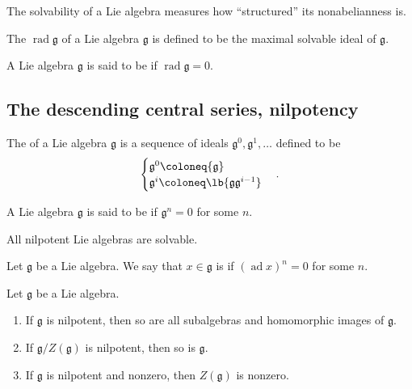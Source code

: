 \documentclass{article}
\DeclarePairedDelimiter\lb\lbrack\rbrack
\DeclareMathOperator{\rad}{rad}
\DeclareMathOperator{\ad}{ad}
\newcommand*\frkg{{\ensuremath{\mathfrak{g}}}}
\begin{document}
The solvability of a Lie algebra measures how ``structured'' its nonabelianness is.

\begin{definition}
    The  $\rad \frkg$ of a Lie algebra $\frkg$ is defined to be the maximal solvable ideal of $\frkg$.
\end{definition}

\begin{definition}
    A Lie algebra $\frkg$ is said to be  if $\rad \frkg = 0$.
\end{definition}

\subsection{The descending central series, nilpotency}

\begin{definition}
    The  of a Lie algebra $\frkg$ is a sequence of ideals $\frkg^0, \frkg^1, \ldots$ defined to be
    \[
        \begin{cases}
            \frkg^0 \coloneq \frkg \\
            \frkg^i \coloneq \lb{\frkg\frkg^{i-1}} \\
        \end{cases}.
    \]
\end{definition}

\begin{definition}
    A Lie algebra $\frkg$ is said to be  if $\frkg^n = 0$ for some $n$.
\end{definition}

\begin{proposition}
    All nilpotent Lie algebras are solvable.
\end{proposition}

\begin{definition}
    Let $\frkg$ be a Lie algebra.
    We say that $x \in \frkg$ is  if $(\ad x)^n = 0$ for some $n$.
\end{definition}

\begin{theorem}
    Let $\frkg$ be a Lie algebra.
    \begin{enumerate}[label=(\alph*)]
        \item 
            If $\frkg$ is nilpotent, then so are all subalgebras and homomorphic images of $\frkg$.
        \item 
            If $\frkg/Z(\frkg)$ is nilpotent, then so is $\frkg$.
        \item 
            If $\frkg$ is nilpotent and nonzero, then $Z(\frkg)$ is nonzero.
    \end{enumerate}
\end{theorem}
\end{document}
